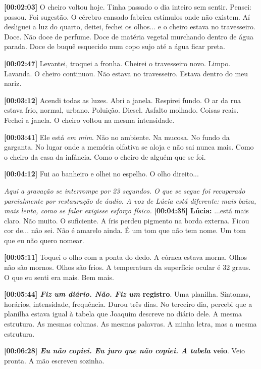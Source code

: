 \noindent \textbf{[00:02:03]} O cheiro voltou hoje. Tinha passado o dia inteiro sem sentir. Pensei: passou. Foi sugestão. O cérebro cansado fabrica estímulos onde não existem. Aí desliguei a luz do quarto, deitei, fechei os olhos... e o cheiro estava no travesseiro. Doce. Não doce de perfume. Doce de matéria vegetal murchando dentro de água parada. Doce de buquê esquecido num copo sujo até a água ficar preta.

\noindent \textbf{[00:02:47]} Levantei, troquei a fronha. Cheirei o travesseiro novo. Limpo. Lavanda. O cheiro continuou. Não estava no travesseiro. Estava dentro do meu nariz.

\noindent \textbf{[00:03:12]} Acendi todas as luzes. Abri a janela. Respirei fundo. O ar da rua estava frio, normal, urbano. Poluição. Diesel. Asfalto molhado. Coisas reais. Fechei a janela. O cheiro voltou na mesma intensidade.

\noindent \textbf{[00:03:41]} Ele está \textit{em mim}. Não no ambiente. Na mucosa. No fundo da garganta. No lugar onde a memória olfativa se aloja e não sai nunca mais. Como o cheiro da casa da infância. Como o cheiro de alguém que se foi.

\noindent \textbf{[00:04:12]} Fui ao banheiro e olhei no espelho. O olho direito...

\noindent \textit{Aqui a gravação se interrompe por 23 segundos. O que se segue foi recuperado parcialmente por restauração de áudio. A voz de Lúcia está diferente: mais baixa, mais lenta, como se falar exigisse esforço físico.}
\noindent \textbf{[00:04:35] Lúcia:} ...está mais claro. Não muito. O suficiente. A íris perdeu pigmento na borda externa. Ficou cor de... não sei. Não é amarelo ainda. É um tom que não tem nome. Um tom que eu não quero nomear.

\noindent \textbf{[00:05:11]} Toquei o olho com a ponta do dedo. A córnea estava morna. Olhos não são mornos. Olhos são frios. A temperatura da superfície ocular é 32 graus. O que eu senti era mais. Bem mais.

\noindent \textbf{[00:05:44]\textit{ Fiz um diário. Não. Fiz um }registro}. Uma planilha. Sintomas, horários, intensidade, frequência. Durou três dias. No terceiro dia, percebi que a planilha estava igual à tabela que Joaquim descreve no diário dele. A mesma estrutura. As mesmas colunas. As mesmas palavras. A minha letra, mas a mesma estrutura.

\noindent \textbf{[00:06:28]\textit{ Eu não copiei. Eu juro que não copiei. A tabela }veio}. Veio pronta. A mão escreveu sozinha.

